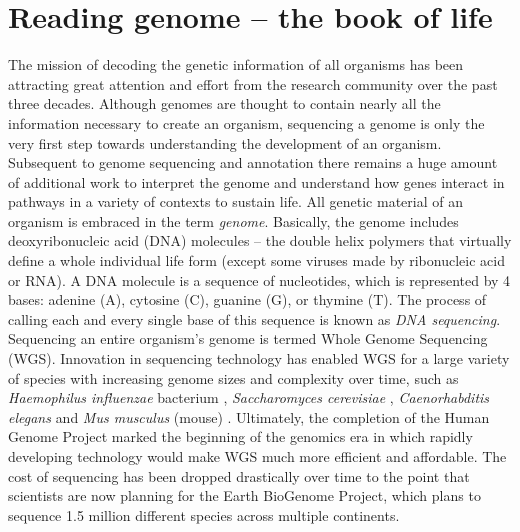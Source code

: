 \section{Reading genome -- the book of life}
% 
The mission of decoding the genetic information of all organisms has been attracting great attention and effort from the research community over the past three decades. 
Although genomes are thought to contain nearly all the information necessary to create an organism, sequencing a genome is only the very first step towards understanding the development of an organism. Subsequent to genome sequencing and annotation there remains a huge amount of additional work to interpret the genome and understand how genes interact in pathways in a variety of contexts to sustain life. 
%
All genetic material of an organism is embraced in the term \emph{genome}. Basically, the genome includes deoxyribonucleic acid (DNA) molecules -- the double helix polymers \cite{Watson1953} that virtually define a whole individual life form (except some viruses made by ribonucleic acid or RNA). 
A DNA molecule is a sequence of nucleotides, which is represented by 4 bases: adenine (A), cytosine (C), guanine (G), or thymine (T). The process of calling each and every single base of this sequence is known as \emph{DNA sequencing}. Sequencing an entire organism's genome is termed Whole Genome Sequencing (WGS). 
Innovation in sequencing technology has enabled WGS for a large variety of species with increasing genome sizes and complexity  over time, such as \emph{Haemophilus influenzae} bacterium \cite{Fleischmann1995}, \emph{Saccharomyces cerevisiae} \cite{Goffeau1996}, \emph{Caenorhabditis elegans} \cite{Sequencing1998} and \emph{Mus musculus} (mouse) \cite{Chinwalla2002}. Ultimately, the completion of the Human Genome Project \cite*{International2004} marked the beginning of the genomics era in which rapidly developing technology would make WGS much more efficient and affordable.
The cost of sequencing has been dropped drastically over time to the point that scientists are now planning for the Earth BioGenome Project, which plans to sequence 1.5 million different species across multiple continents\cite{Lewin2018earth}.

